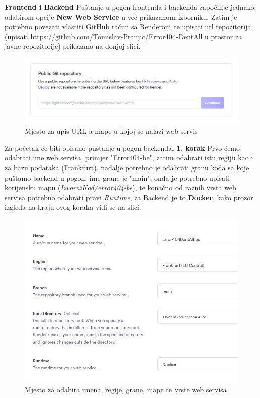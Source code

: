 			\textbf{Frontend i Backend} \newline
			Puštanje u pogon frontenda i backenda započinje jednako, odabirom opcije \textbf{New Web Service} u već prikazanom izborniku. Zatim je potrebno povezati vlastiti GitHub račun sa Renderom te upisati url repozitorija (upisati \url{https://github.com/Tomislav-Pranjic/Error404-DentAll} u prostor za javne repozitorije) prikazano na donjoj slici.
			\begin{figure}[H]
				\includegraphics[width=\linewidth]{slike/PublicRepo.JPG}
				\centering
				\caption{Mjesto za upis URL-a mape u kojoj se nalazi web servis}
				\label{fig:Izbornik za puštanje web servisa}
			\end{figure}
			Za početak će biti opisano puštanje u pogon backenda. \newline
			\textbf{1. korak} \newline 
			Prvo ćemo odabrati ime web servisa, primjer "Error404-be", zatim odabrati istu regiju kao i za bazu podataka (Frankfurt), nadalje potrebno je odabrati granu koda sa koje puštamo backend u pogon, ime grane je "main", onda je potrebno upisati korijensku mapu (\textit{IzvorniKod/error404-be}), te konačno od raznih vrsta web servisa potrebno odabrati pravi \textit{Runtime}, za Backend je to \textbf{Docker}, kako prozor izgleda na kraju ovog koraka vidi se na slici.
			\begin{figure}[H]
				\includegraphics[width=\linewidth]{slike/BackendPtOne.JPG}
				\centering
				\caption{Mjesto za odabira imena, regije, grane, mape te vrste web servisa}
				\label{fig:Backend prvi}
			\end{figure}
